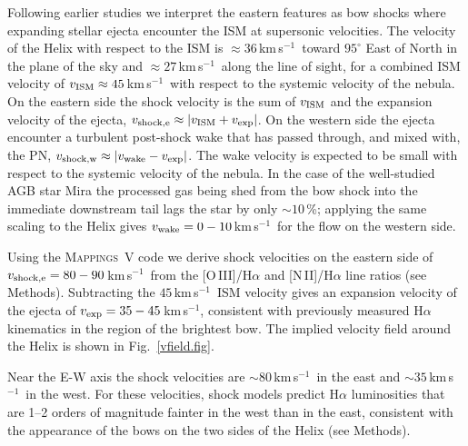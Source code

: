 \documentclass{nature_arxiv}
\newcommand{\kms}{km\,s$^{-1}$}
\begin{document}
Following earlier studies we
interpret the eastern features as bow shocks where expanding stellar ejecta
encounter the ISM at supersonic velocities.\cite{zhang:12,meaburn:13}
The velocity of the Helix with respect to the ISM is
$\approx36$\,\kms\
toward $95^{\circ}$ East of North in the plane of the sky and $\approx 27$\,\kms\
along the line of sight,\cite{meaburn:13,gaia_dr3}
for a combined ISM velocity of $v_{\rm ISM}\approx 45$\,\kms\ with respect
to the systemic velocity of the nebula. On the eastern side the
shock velocity is the sum of $v_{\rm ISM}$ and the
expansion velocity of the ejecta, $v_{\rm shock,e} \approx |v_{\rm ISM} + v_{\rm exp}|$.
On the western side the ejecta encounter a turbulent
post-shock wake that has passed through, and mixed with,
the PN, $v_{\rm shock,w} \approx |v_{\rm wake} - v_{\rm exp}|$.
The wake velocity is expected to be small with respect to the systemic
velocity of the nebula.
In the case of the well-studied AGB star Mira the processed gas being shed
from the bow shock into the immediate downstream tail lags the star by only
$\sim 10$\,\%;\cite{wareing07,Matthews2008} applying the same
scaling to the Helix gives
$v_{\rm wake} =0-10$\,\kms\ for the flow on the western side.

Using the
\textsc{Mappings~V} code\cite{Sutherland2018} we derive
shock velocities on the eastern side
of $v_{\rm shock,e} = 80-90$\,\kms\ from the [O\,III]/H$\alpha$ and
[N\,II]/H$\alpha$ line ratios (see Methods).
Subtracting the $45$\,\kms\ ISM velocity gives an
expansion velocity of the ejecta of $v_{\rm exp}=35-45$\,\kms,
consistent with previously measured H$\alpha$ kinematics in the region
of the brightest bow.\cite{meaburn:13}
The implied velocity field around the Helix is shown in Fig.\ \ref{vfield.fig}.

Near the E-W axis
the shock velocities are $\sim 80$\,\kms\ in the east and
$\sim 35$\,\kms\ in the west.
For these velocities,
shock models predict H$\alpha$ luminosities that are
1--2 orders of magnitude fainter in the west than in the east,
consistent with the appearance
of the bows on the two sides of the Helix (see Methods).
\end{document}
